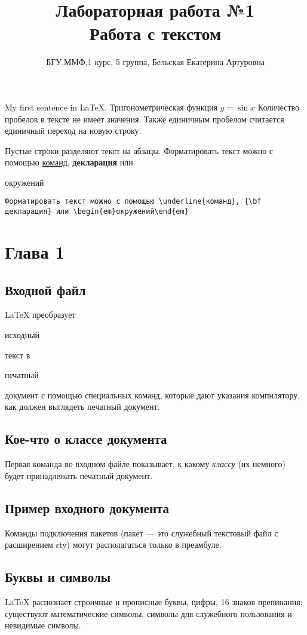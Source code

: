 \documentclass[a4paper,12pt]{article}
\title{Лабораторная работа №1\\Работа с текстом}
\author{БГУ,ММФ,1 курс, 5 группа, Бельская Екатерина Артуровна}
\begin{document}
\maketitle
My first sentence in \LaTeX.
Тригонометрическая функция $y=\sin{x}$
Количество пробелов в тексте         не имеет значения.
Также единичным пробелом считается единичный переход на новую строку.

Пустые строки разделяют текст на абзацы.
Форматировать текст можно с помощью \underline{команд}, {\bf декларация} или \begin{em}окружений\end{em}
\begin{verbatim}
Форматировать текст можно с помощью \underline{команд}, {\bf декларация} или \begin{em}окружений\end{em}
\end{verbatim}
\newpage
\section{Глава 1}
\subsection{Входной файл}
\LaTeX{} преобразует \begin{em}исходный\end{em} текст в \begin{em}печатный\end{em} документ с помощью специальных команд, которые дают указания компилятору, как должен выглядеть печатный документ.
\subsection{Кое-что о классе документа}
Первая команда во входном файле показывает, к какому {\em классу} (их немного) будет принадлежать печатный документ.
\subsection{Пример входного документа}
Команды подключения пакетов (пакет --- это служебный текстовый файл с расширением sty) могут располагаться только в преамбуле.
\subsection{Буквы и символы}
\LaTeX{} распознает строичные и прописные буквы, цифры, 16 знаков препинания; существуют математические символы, символы для служебного пользования и невидимые символы.
\end{document}
